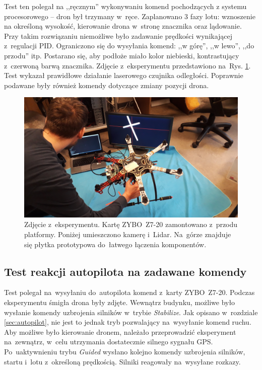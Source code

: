 Test ten polegał na ,,ręcznym'' wykonywaniu komend pochodzących z systemu procesorowego -- dron był trzymany w~ręce. 
Zaplanowano 3 fazy lotu: wznoszenie na określoną wysokość, kierowanie drona w~stronę znacznika oraz lądowanie.
Przy takim rozwiązaniu niemożliwe było zadawanie prędkości wynikającej z~regulacji PID. 
Ograniczono się do wysyłania komend: ,,w górę'', ,,w lewo'', ,,do przodu'' itp. 
Postarano się, aby podłoże miało kolor niebieski, kontrastujący z~czerwoną barwą znacznika. 
Zdjęcie z~eksperymentu przedstawiono na~Rys. \ref{fig:eksperyment}.\\
Test wykazał prawidłowe działanie laserowego czujnika odległości. 
Poprawnie podawane były również komendy dotyczące zmiany pozycji drona. 
\begin{figure}[h]
	\centering
	\includegraphics[width=\textwidth]{eksperyment.jpg}
	\caption{Zdjęcie z~eksperymentu. Kartę ZYBO~Z7-20 zamontowano z~przodu platformy. Poniżej umieszczono kamerę i~Lidar. Na~górze znajduje się płytka prototypowa do~łatwego łączenia komponentów.}
	\label{fig:eksperyment}
\end{figure}
\subsection{Test reakcji autopilota na zadawane komendy}
\label{sec:test_autopilota}
Test polegał na~wysyłaniu do~autopilota komend z~karty ZYBO~Z7-20. %
Podczas eksperymentu śmigła drona były zdjęte. 
Wewnątrz budynku, możliwe było wysłanie komendy uzbrojenia silników w~trybie \textit{Stabilize}. 
Jak opisano w~rozdziale \ref{sec:autopilot}, nie jest to jednak tryb pozwalający na~wysyłanie komend ruchu.
Aby możliwe było kierowanie dronem, należało przeprowadzić eksperyment na~zewnątrz, w~celu utrzymania dostatecznie silnego sygnału GPS. 
Po~uaktywnieniu trybu \textit{Guided} wysłano kolejno komendy uzbrojenia silników, startu i~lotu z~określoną prędkością. 
Silniki reagowały na~wysyłane rozkazy.

